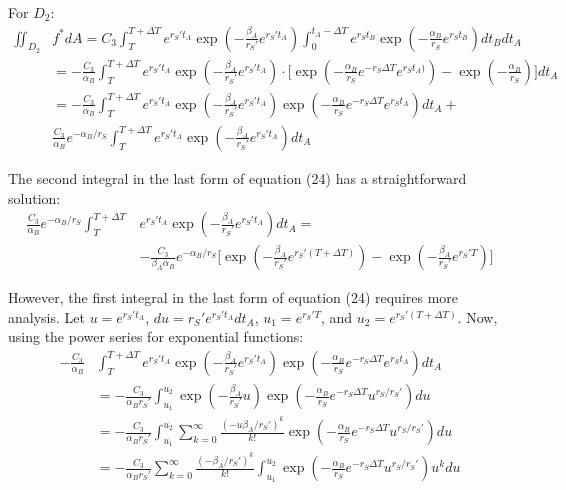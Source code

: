 \documentclass{article}
\begin{document}
For $D_2$:
\begin{equation}
\begin{split}
\iint_{D_2} & f^* dA = C_3\int_T^{T+\Delta T} e^{r_S' t_A} \exp(-\frac{\beta_A}{r_S'} e^{r_S' t_A}) \int_0^{t_A-\Delta T} e^{r_S t_B} \exp(-\frac{\alpha_B}{r_S} e^{r_S t_B}) dt_B dt_A \\
&= -\frac{C_3}{\alpha_B} \int_T^{T+\Delta T} e^{r_S't_A} \exp(-\frac{\beta_A}{r_S'} e^{r_S' t_A})\cdot \Big[\exp(-\frac{\alpha_B}{r_S} e^{-r_S \Delta T} e^{r_S t_A)}) - \exp(-\frac{\alpha_B}{r_S})\Big]dt_A \\
& =-\frac{C_3}{\alpha_B} \int_T^{T+\Delta T} e^{r_S' t_A} \exp(-\frac{\beta_A}{r_S'} e^{r_S't_A}) \exp(-\frac{\alpha_B}{r_S} e^{-r_S \Delta T} e^{r_S t_A}) dt_A +\\
&\frac{C_3}{\alpha_B} e^{-\alpha_B/r_S}\int_T^{T+\Delta T} e^{r_S' t_A} \exp(-\frac{\beta_A}{r_S'} e^{r_S' t_A}) dt_A
\end{split}
\end{equation}

The second integral in the last form of equation (24) has a straightforward solution: 
\begin{equation}
\begin{split}
\frac{C_3}{\alpha_B} e^{-\alpha_B/r_S}\int_T^{T+\Delta T} & e^{r_S' t_A} \exp(-\frac{\beta_A}{r_S'} e^{r_S' t_A}) dt_A =\\
& -\frac{C_3}{\beta_A \alpha_B} e^{-\alpha_B/r_S} \Big[\exp(-\frac{\beta_A}{r_S'} e^{r_S' (T + \Delta T)}) - \exp( -\frac{\beta_A}{r_S'} e^{r_S' T})\Big]
\end{split}
\end{equation}

However, the first integral in the last form of equation (24) requires more analysis.  Let $u = e^{r_S' t_A}$, $du = r_S' e^{r_S' t_A} dt_A$, $u_1 = e^{r_S' T}$, and $u_2 = e^{r_S'(T+\Delta T)}$.  Now, using the power series for exponential functions:
\begin{equation}
\begin{split}
-\frac{C_3}{\alpha_B} & \int_T^{T+\Delta T} e^{r_S' t_A} \exp(-\frac{\beta_A}{r_S'} e^{r_S't_A}) \exp(-\frac{\alpha_B}{r_S} e^{-r_S \Delta T} e^{r_S t_A}) dt_A\\
& = -\frac{C_3}{\alpha_B r_S'}\int_{u_1}^{u_2} \exp(-\frac{\beta_A}{r_S'}u) \exp(-\frac{\alpha_B}{r_S} e^{-r_S \Delta T} u^{r_S/r_S'})du \\
& = -\frac{C_3}{\alpha_B r_S'} \int_{u_1}^{u_2} \sum_{k=0}^{\infty} \frac{(-u\beta_A/r_S')^k}{k!} \exp(-\frac{\alpha_B}{r_S} e^{-r_S \Delta T} u^{r_S/r_S'}) du \\
& = -\frac{C_3}{\alpha_B r_S'} \sum_{k=0}^{\infty} \frac{(-\beta_A/r_S')^k}{k!} \int_{u_1}^{u_2} \exp(-\frac{\alpha_B}{r_S} e^{-r_S \Delta T} u^{r_S/r_S'})u^k du
\end{split}
\end{equation}
\end{document}
